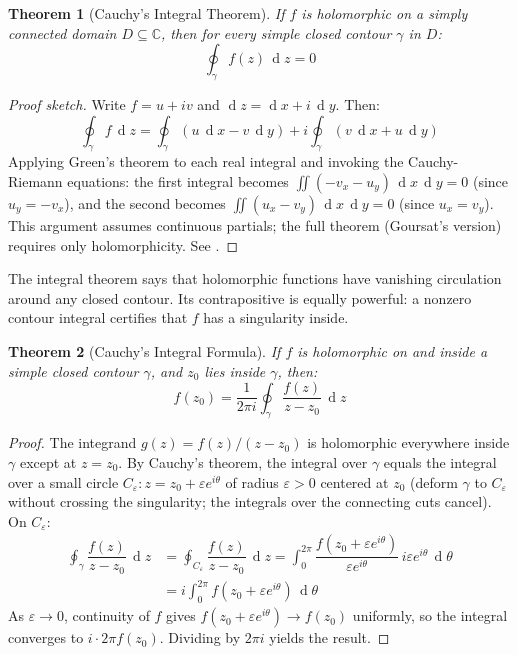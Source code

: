 \documentclass[12pt,a4paper]{report}
\DeclareMathOperator{\deriv}{d}
\theoremstyle{thms}
\newtheorem{theorem}{Theorem}[section]
\theoremstyle{defns}
\begin{document}
\begin{theorem}[Cauchy's Integral Theorem]
    If $f$ is holomorphic on a simply connected domain $D \subseteq \mathbb{C}$, then for every simple closed contour $\gamma$ in $D$:
    \begin{equation}
        \oint_\gamma f(z)\,\deriv{z} = 0
    \end{equation}
\end{theorem}

\begin{proof}[Proof sketch]
    Write $f = u + iv$ and $\deriv{z} = \deriv{x} + i\,\deriv{y}$. Then:
    \begin{equation}
        \oint_\gamma f\,\deriv{z} = \oint_\gamma (u\,\deriv{x} - v\,\deriv{y}) + i\oint_\gamma (v\,\deriv{x} + u\,\deriv{y})
    \end{equation}
    Applying Green's theorem to each real integral and invoking the Cauchy-Riemann equations: the first integral becomes $\iint(-v_x - u_y)\,\deriv{x}\,\deriv{y} = 0$ (since $u_y = -v_x$), and the second becomes $\iint(u_x - v_y)\,\deriv{x}\,\deriv{y} = 0$ (since $u_x = v_y$). This argument assumes continuous partials; the full theorem (Goursat's version) requires only holomorphicity. See \cite{ahlfors_complex}.
\end{proof}

The integral theorem says that holomorphic functions have vanishing circulation around any closed contour. Its contrapositive is equally powerful: a nonzero contour integral certifies that $f$ has a singularity inside.

\begin{theorem}[Cauchy's Integral Formula]
    If $f$ is holomorphic on and inside a simple closed contour $\gamma$, and $z_0$ lies inside $\gamma$, then:
    \begin{equation}
        f(z_0) = \dfrac{1}{2\pi i}\oint_\gamma \dfrac{f(z)}{z - z_0}\,\deriv{z}
        \label{eq:cauchy_formula}
    \end{equation}
\end{theorem}

\begin{proof}
    The integrand $g(z) = f(z)/(z - z_0)$ is holomorphic everywhere inside $\gamma$ except at $z = z_0$. By Cauchy's theorem, the integral over $\gamma$ equals the integral over a small circle $C_\varepsilon: z = z_0 + \varepsilon e^{i\theta}$ of radius $\varepsilon > 0$ centered at $z_0$ (deform $\gamma$ to $C_\varepsilon$ without crossing the singularity; the integrals over the connecting cuts cancel). On $C_\varepsilon$:
    \begin{align}
        \oint_\gamma \dfrac{f(z)}{z - z_0}\,\deriv{z} &= \oint_{C_\varepsilon} \dfrac{f(z)}{z - z_0}\,\deriv{z} = \int_0^{2\pi} \dfrac{f(z_0 + \varepsilon e^{i\theta})}{\varepsilon e^{i\theta}}\,i\varepsilon e^{i\theta}\,\deriv{\theta} \\
        &= i\int_0^{2\pi} f(z_0 + \varepsilon e^{i\theta})\,\deriv{\theta}
    \end{align}
    As $\varepsilon \to 0$, continuity of $f$ gives $f(z_0 + \varepsilon e^{i\theta}) \to f(z_0)$ uniformly, so the integral converges to $i \cdot 2\pi f(z_0)$. Dividing by $2\pi i$ yields the result.
\end{proof}
\end{document}
